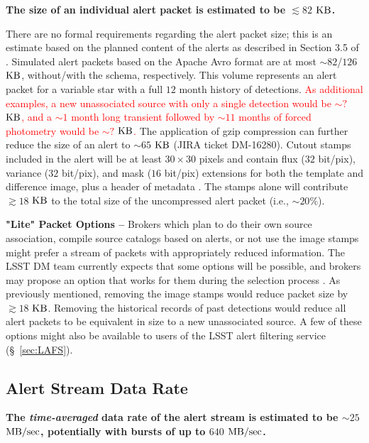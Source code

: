 \documentclass[DM,authoryear,toc]{lsstdoc}
\begin{document}
{\bf The size of an individual alert packet is estimated to be $\lesssim82$ $\rm KB$.}

There are no formal requirements regarding the alert packet size; this is an estimate based on the planned content of the alerts as described in Section 3.5 of . Simulated alert packets based on the Apache Avro format are at most $\sim82$/$126$ $\rm KB$, without/with the schema, respectively. This volume represents an alert packet for a variable star with a full $12$ month history of detections. \textcolor{red}{As additional examples, a new unassociated source with only a single detection would be $\sim?$ $\rm KB$, and a $\sim1$ month long transient followed by $\sim11$ months of forced photometry would be $\sim?$ $\rm KB$.} The application of gzip compression can further reduce the size of an alert to $\sim65$ $\rm KB$ (JIRA ticket DM-16280). Cutout stamps included in the alert will be at least $30\times30$ pixels and contain flux ($32$ bit/pix), variance ($32$ bit/pix), and mask ($16$ bit/pix) extensions for both the template and difference image, plus a header of metadata . The stamps alone will contribute $\gtrsim18$ $\rm KB$ to the total size of the uncompressed alert packet (i.e., $\sim20\%$).

{\bf "Lite" Packet Options --} Brokers which plan to do their own source association, compile source catalogs based on alerts, or not use the image stamps might prefer a stream of packets with appropriately reduced information. The LSST DM team currently expects that some options will be possible, and brokers may propose an option that works for them during the selection process . As previously mentioned, removing the image stamps would reduce packet size by $\gtrsim18$ $\rm KB$. Removing the historical records of past detections would reduce all alert packets to be equivalent in size to a new unassociated source. A few of these options might also be available to users of the LSST alert filtering service (\S~\ref{sec:LAFS}). 


\subsection{Alert Stream Data Rate}\label{ssec:data_rate}

{\bf The {\it time-averaged} data rate of the alert stream is estimated to be $\sim25$ $\rm MB/sec$, potentially with bursts of up to $640$ $\rm MB/sec$.}
\end{document}
